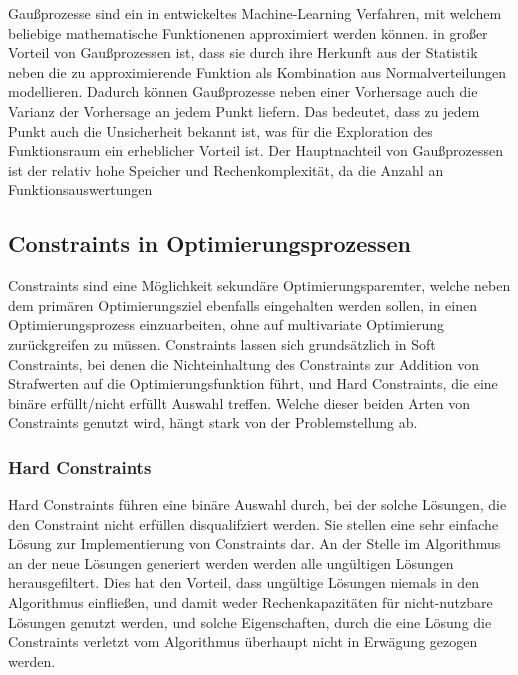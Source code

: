 Gaußprozesse sind ein in  entwickeltes Machine-Learning Verfahren, mit welchem beliebige mathematische Funktionenen approximiert werden können. in großer Vorteil von Gaußprozessen ist, dass sie durch ihre Herkunft aus der Statistik neben die zu approximierende Funktion als Kombination aus Normalverteilungen modellieren.
Dadurch können Gaußprozesse neben einer Vorhersage auch die Varianz der Vorhersage an jedem Punkt liefern.
Das bedeutet, dass zu jedem Punkt auch die Unsicherheit bekannt ist, was für die Exploration des Funktionsraum
ein erheblicher Vorteil ist.
Der Hauptnachteil von Gaußprozessen ist der relativ hohe Speicher und Rechenkomplexität, da die Anzahl an Funktionsauswertungen 
\subsection{Constraints in Optimierungsprozessen}
Constraints sind eine Möglichkeit sekundäre Optimierungsparemter, welche neben dem primären Optimierungsziel ebenfalls eingehalten werden sollen, in einen Optimierungsprozess einzuarbeiten, ohne auf multivariate Optimierung zurückgreifen zu müssen.
Constraints lassen sich grundsätzlich in Soft Constraints, bei denen die Nichteinhaltung des Constraints zur Addition von Strafwerten auf die Optimierungsfunktion führt, und Hard Constraints, die eine binäre erfüllt/nicht erfüllt Auswahl treffen.
Welche dieser beiden Arten von Constraints genutzt wird, hängt stark von der Problemstellung ab.

\subsubsection{Hard Constraints}
Hard Constraints führen eine binäre Auswahl durch, bei der solche Lösungen, die den Constraint nicht erfüllen disqualifziert werden.
Sie stellen eine sehr einfache Lösung zur Implementierung von Constraints dar.
An der Stelle im Algorithmus an der neue Lösungen generiert werden werden alle ungültigen Lösungen herausgefiltert.
Dies hat den Vorteil, dass ungültige Lösungen niemals in den Algorithmus einfließen, und damit weder Rechenkapazitäten für nicht-nutzbare Lösungen genutzt werden, und solche Eigenschaften, durch die eine Lösung die Constraints verletzt vom Algorithmus überhaupt nicht in Erwägung gezogen werden.


